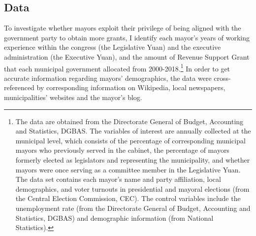 \subsection*{Data}
To investigate whether mayors exploit their privilege of being aligned with the government party to obtain more grants, I identify each mayor's years of working experience within the congress (the Legislative Yuan) and the executive administration  (the Executive Yuan), and the amount of Revenue Support Grant that each municipal government allocated from 2000-2018.\footnote{The data are obtained from the Directorate General of Budget, Accounting and Statistics, DGBAS. The variables of interest are annually collected at the municipal level, which consists of the percentage of corresponding municipal mayors who previously served in the cabinet, the percentage of mayors formerly elected as legislators and representing the municipality, and whether mayors were once serving as a committee member in the Legislative Yuan. The data set contains each mayor's name and party affiliation, local demographics, and voter turnouts in presidential and mayoral elections (from the Central Election Commission, CEC). The control variables include the unemployment rate (from the Directorate General of Budget, Accounting and Statistics, DGBAS) and demographic information (from National Statistics).} In order to get accurate information regarding mayors' demographics, the data were cross-referenced by corresponding information on Wikipedia, local newspapers, municipalities' websites and the mayor's blog.

